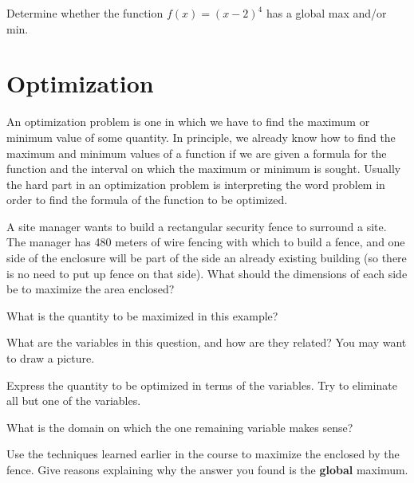\vfill


\newpage
\problem Determine whether the function $f(x) = (x-2)^4$ has a global
  max and/or min.

\vfill

\newpage

\section*{Optimization}

An optimization problem is one in which we have to find the maximum or
minimum value of some quantity.  In principle, we already know how to
find the maximum and minimum values of a function if we are given a
formula for the function and the interval on which the maximum or
minimum is sought.  Usually the hard part in an optimization problem
is interpreting the word problem in order to find the formula of the
function to be optimized.

\vsc 

\newpage 

\problem A site manager wants to build a rectangular security fence to
surround a site.  The manager has 480 meters of wire fencing with
which to build a fence, and one side of the enclosure will be part of
the side an already existing building (so there is no need to put up
fence on that side). What should the dimensions of each side be to
maximize the area enclosed?

\vsc


What is the quantity to be maximized in this example?

\vspace{2cm}

\newpage

\problem What are the variables in this question, and how are they
related?  You may want to draw a picture.

\vfill

Express the quantity to be optimized in terms of the
  variables.  Try to eliminate all but one of the variables.

  \vfill

  What is the domain on which the one remaining variable
    makes sense?

\vspace{2cm} 
  \newpage 

  \problem Use the techniques learned earlier in the course to
  maximize the enclosed by the fence.  Give reasons explaining why the
  answer you found is the {\bf global} maximum.

